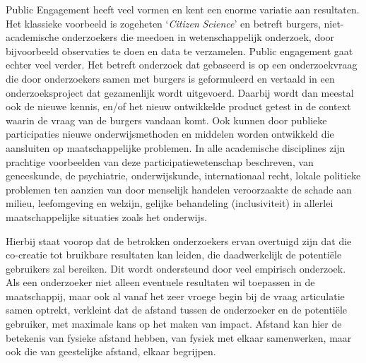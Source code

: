 \documentclass[smallauthor, chapterhaspagenum, nochapterinheader, pagenuminheader,  bigchapnum,medium2, tocpages, garamond, titleinheader]{jote-book}
\begin{document}
	Public Engagement heeft veel vormen en kent een enorme variatie aan resultaten. Het klassieke voorbeeld is zogeheten ‘\emph{Citizen}\emph{ }\emph{Science}' en betreft burgers, niet-academische onderzoekers die meedoen in wetenschappelijk onderzoek, door bijvoorbeeld observaties te doen en data te verzamelen. Public engagement gaat echter veel verder. Het betreft onderzoek dat gebaseerd is op een onderzoekvraag die door onderzoekers samen met burgers is geformuleerd en vertaald in een onderzoeksproject dat gezamenlijk wordt uitgevoerd. Daarbij wordt dan meestal ook de nieuwe kennis, en/of het nieuw ontwikkelde product getest in de context waarin de vraag van de burgers vandaan komt. Ook kunnen door publieke participaties nieuwe onderwijsmethoden en middelen worden ontwikkeld die aansluiten op maatschappelijke problemen. In alle academische disciplines zijn prachtige voorbeelden van deze participatiewetenschap beschreven, van geneeskunde, de psychiatrie, onderwijskunde, internationaal recht, lokale politieke problemen ten aanzien van door menselijk handelen veroorzaakte de schade aan milieu, leefomgeving en welzijn, gelijke behandeling (inclusiviteit) in allerlei maatschappelijke situaties zoals het onderwijs.



	Hierbij staat voorop dat de betrokken onderzoekers ervan overtuigd zijn dat die co-creatie tot bruikbare resultaten kan leiden, die daadwerkelijk de potentiële gebruikers zal bereiken. Dit wordt ondersteund door veel empirisch onderzoek. Als een onderzoeker niet alleen eventuele resultaten wil toepassen in de maatschappij, maar ook al vanaf het zeer vroege begin bij de vraag articulatie samen optrekt, verkleint dat de afstand tussen de onderzoeker en de potentiële gebruiker, met maximale kans op het maken van impact. Afstand kan hier de betekenis van fysieke afstand hebben, van fysiek met elkaar samenwerken, maar ook die van geestelijke afstand, elkaar begrijpen.
\end{document}
